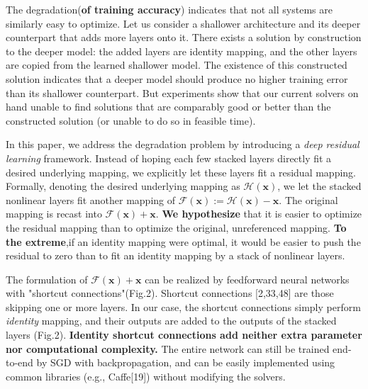 The degradation(\textbf{of training accuracy}) indicates that not all systems are similarly easy to optimize. Let us consider a shallower architecture and its deeper counterpart that adds more layers onto it. There exists a solution by construction to the deeper model: the added layers are identity mapping, and the other layers are copied from the learned shallower model. The existence of this constructed solution indicates that a deeper model should produce no higher training error than its shallower counterpart. But experiments show that our current solvers on hand unable to find solutions that are comparably good or better than the constructed solution (or unable to do so in feasible time).

In this paper, we address the degradation problem by introducing a \textit{deep residual learning} framework. Instead of hoping each few stacked layers directly fit a desired underlying mapping, we explicitly let these layers fit a residual mapping. Formally, denoting the desired underlying mapping as $\mathcal{H}(\mathbf{x})$, we let the stacked nonlinear layers fit another mapping of $\mathcal{F}(\mathbf{x}) := \mathcal{H}(\mathbf{x}) - \mathbf{x}$. The original mapping is recast into $\mathcal{F}(\mathbf{x}) + \mathbf{x}$. \textbf{We hypothesize} that it is easier to optimize the residual mapping than to optimize the original, unreferenced mapping. \textbf{To the extreme},if an identity mapping were optimal, it would be easier to push the residual to zero than to fit an identity mapping by a stack of nonlinear layers.

The formulation of $\mathcal{F}(\mathbf{x}) + \mathbf{x}$ can be realized by feedforward neural networks with "shortcut connections"(Fig.2). Shortcut connections [2,33,48] are those skipping one or more layers. In our case, the shortcut connections simply perform \textit{identity} mapping, and their outputs are added to the outputs of the stacked layers (Fig.2). \textbf{Identity shortcut connections add neither extra parameter nor computational complexity.} The entire network can still be trained end-to-end by SGD with backpropagation, and can be easily implemented using common libraries (e.g., Caffe[19]) without modifying the solvers.

